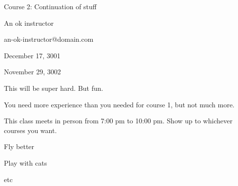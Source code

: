 
Course 2: Continuation of stuff

An ok instructor

an-ok-instructor@domain.com

December 17, 3001

November 29, 3002

This will be super hard. But fun.

You need more experience than you needed for course 1, but not much more.

This class meets in person from 7:00 pm to 10:00 pm. Show up to whichever courses you want.

\item Fly better
\item Play with cats
\item etc

